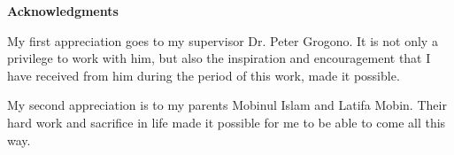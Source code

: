 \newpage
{}
\label{acknowledgments}
\begin{center}
\Large \textbf{Acknowledgments}\\[0.5cm]
\end{center}

My first appreciation goes to my supervisor Dr. Peter Grogono. It is not only a privilege to work with him, but also the inspiration and encouragement that I have received from him during the period of this work, made it possible.

My second appreciation is to my parents Mobinul Islam and Latifa Mobin. Their hard work and sacrifice in life made it possible for me to be able to come all this way.